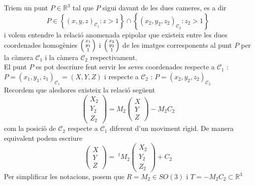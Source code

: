 \documentclass[../main.tex]{subfiles}
\begin{document}
	Triem un punt $P \in \mathbb{R}^3$ tal que $P$ sigui davant de les dues cameres, es a dir
	\begin{displaymath}
		P \in \left\{(x,y,z)_{\mathcal{C}_1} : z > 1 \right\}\cap\left\{(x_2,y_2,z_2)_{\mathcal{C}_2} : z_2 > 1 \right\}
	\end{displaymath}
	i volem entendre la relació anomenada epipolar que existeix entre les dues coordenades homogènies $\begin{psmallmatrix}x_1\\y_1\\1\end{psmallmatrix}$ i $\begin{psmallmatrix}x_2\\y_2\\1\end{psmallmatrix}$ de les imatges corresponents al punt $P$ per la càmera $\mathcal{C}_1$ i la càmera $\mathcal{C}_2$ respectivament.\\
	El punt $P$ es pot descriure fent servir les seves coordenades respecte a $\mathcal{C}_1$ : $P = (x_1, y_1, z_1)_{\mathcal{C}_1} = (X,Y,Z)$ i respecte a $\mathcal{C}_2$ : $P = (x_2, y_2, z_2)_{\mathcal{C}_2}$\\
	Recordem que aleshores existeix la relació següent
	\begin{displaymath}
		\begin{pmatrix}
			X_2\\Y_2\\Z_2
		\end{pmatrix} =
		M_2 \begin{pmatrix}
			X\\Y\\Z
			\end{pmatrix}
		- M_2C_2
	\end{displaymath}
	com la posiciò de $\mathcal{C}_2$ respecte a $\mathcal{C}_1$ diferent d'un moviment rìgid. De manera equivalent podem escriure
	\begin{displaymath}
	\begin{pmatrix}
		X\\Y\\Z
	\end{pmatrix} =
	\;^tM_2 \begin{pmatrix}
		X_2\\Y_2\\Z_2
		\end{pmatrix}
	+ C_2
	\end{displaymath}
	Per simplificar les notacions, posem que $R = M_2 \in SO(3)$ i $T = -M_2C_2 \subset \mathbb{R}^3$
\end{document}
